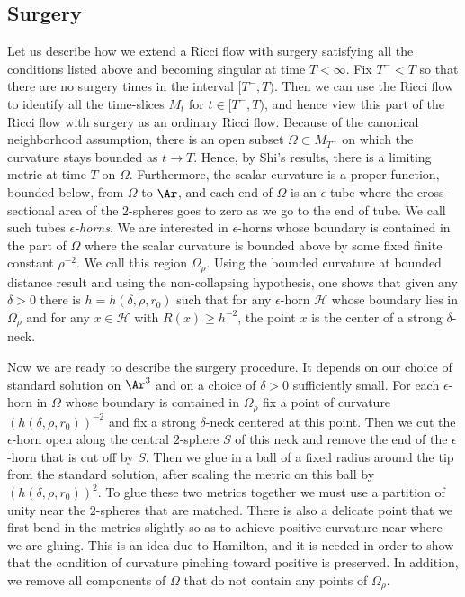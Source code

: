 \subsection{Surgery}

Let us describe how we extend a Ricci flow with surgery satisfying
all the conditions listed above and becoming singular at time
$T<\infty$. Fix $T^-<T$ so that there are no surgery  times in the
interval $[T^-,T)$. Then we can use the Ricci flow to identify all
the time-slices $M_t$ for $t\in [T^-,T)$, and hence view this part
of the Ricci flow with surgery as an ordinary Ricci flow. Because of
the canonical neighborhood assumption, there is an open subset
$\Omega\subset M_{T^-}$ on which the curvature stays bounded as
$t\rightarrow T$. Hence, by Shi's results, there is a limiting
metric at time $T$ on $\Omega$. Furthermore, the scalar curvature is
a proper function, bounded below, from $\Omega$ to $\Ar$, and each
end of $\Omega$ is an $\epsilon$-tube where the cross-sectional area
of the $2$-spheres goes to zero as we go to the end of tube. We call
such tubes {\em $\epsilon$-horns}. We are interested in
$\epsilon$-horns whose boundary is contained in the part of $\Omega$
where the scalar curvature is bounded above by some fixed finite
constant $\rho^{-2}$. We call this region $\Omega_\rho$. Using the
bounded curvature at bounded distance result and using the
non-collapsing hypothesis, one shows that given any $\delta>0$ there
is $h=h(\delta,\rho,r_0)$ such that for any $\epsilon$-horn
${\mathcal H}$ whose boundary lies in $\Omega_\rho$ and for any
$x\in{\mathcal H}$ with $R(x)\ge h^{-2}$, the point $x$ is the
center of a strong $\delta$-neck.

Now we are ready to describe the surgery procedure. It depends on
our choice of standard solution on $\Ar ^3$ and on a choice of
$\delta>0$ sufficiently small. For each $\epsilon$-horn in $\Omega$
whose boundary is contained in $\Omega_\rho$ fix a point of
curvature $(h(\delta, \rho,r_0))^{-2}$ and fix a strong
$\delta$-neck centered at this point. Then we cut the
$\epsilon$-horn open along the central $2$-sphere $S$ of this neck
and remove the end of the $\epsilon$-horn that is cut off by $S$.
Then we glue in a ball of a fixed radius around the tip from the
standard solution, after scaling the metric on this ball by
$(h(\delta,\rho,r_0))^2$. To glue these two metrics together we must
use a partition of unity near the $2$-spheres that are matched.
There is also a delicate point that we first bend in the metrics
slightly so as to achieve positive curvature near where we are
gluing. This is an idea due to Hamilton, and it is needed in order
to show that the condition of curvature pinching toward positive  is
preserved. In addition, we remove all components of $\Omega$ that do
not contain any points of $\Omega_\rho$.


